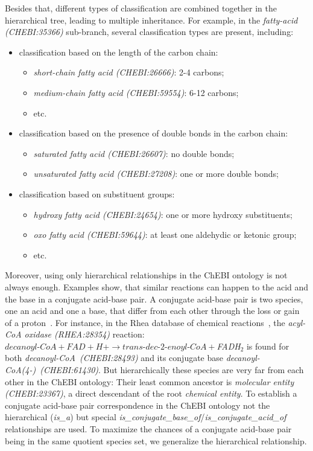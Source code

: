 \documentclass[9pt]{article}
\begin{document}
Besides that, different types of classification are combined together in the hierarchical tree, leading to multiple inheritance. For example, in the \textit{fatty-acid (CHEBI:35366)} sub-branch, several classification types are present, including:
\begin{itemize}
\item classification based on the length of the carbon chain:
\begin{itemize}
\item \textit{short-chain fatty acid (CHEBI:26666)}: 2-4 carbons;
\item \textit{medium-chain fatty acid (CHEBI:59554)}: 6-12 carbons;
\item etc.
\end{itemize}
\item classification based on the presence of double bonds in the carbon chain:
\begin{itemize}
\item \textit{saturated fatty acid (CHEBI:26607)}: no double bonds;
\item \textit{unsaturated fatty acid (CHEBI:27208)}: one or more double bonds;
\end{itemize}
\item classification based on substituent groups:
\begin{itemize}
\item \textit{hydroxy fatty acid (CHEBI:24654)}: one or more hydroxy substituents;
\item \textit{oxo fatty acid (CHEBI:59644)}: at least one aldehydic or ketonic group;
\item etc.
\end{itemize}
\end{itemize}

Moreover, using only hierarchical relationships in the ChEBI ontology is not always enough. Examples show, that similar reactions can happen to the acid and the base in a conjugate acid-base pair. A conjugate acid-base pair is two species, one an acid and one a base, that differ from each other through the loss or gain of a proton~\citep{stoker2012general}. For instance, in the Rhea database of chemical reactions~\citep{Alcantara2012}, the \textit{acyl-CoA oxidase (RHEA:28354)} reaction: $\textit{decanoyl-CoA} + \textit{FAD} + \textit{H+} \rightarrow \textit{trans-dec-2-enoyl-CoA} + $\textit{FADH$_2$} is found for both \textit{decanoyl-CoA~(CHEBI:28493)} and its conjugate base \textit{decanoyl-CoA(4-)~(CHEBI:61430)}. But hierarchically these species are very far from each other in the ChEBI ontology: Their least common ancestor is \textit{molecular entity (CHEBI:23367)}, a direct descendant of the root \textit{chemical entity}. To establish a conjugate acid-base pair correspondence in the ChEBI ontology not the hierarchical (\textit{is\_a}) but special \textit{is\_conjugate\_base\_of}/\textit{is\_conjugate\_acid\_of} relationships are used. To maximize the chances of a conjugate acid-base pair being in the same quotient species set, we generalize the hierarchical relationship.
\end{document}
